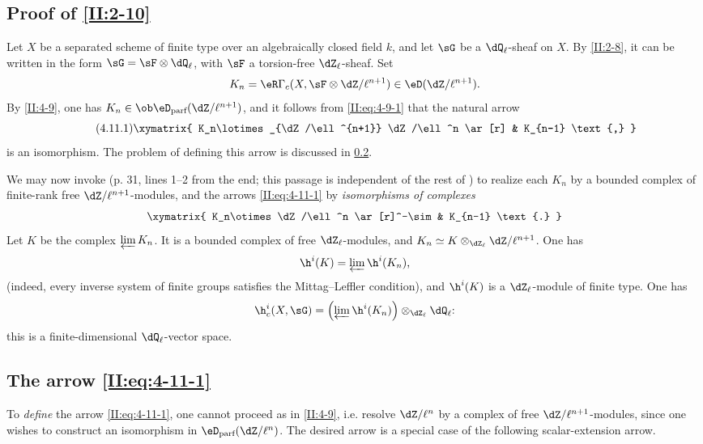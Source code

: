 \documentclass[oneside]{book}
\begin{document}
\subsection{Proof of \texorpdfstring{\ref{II:2-10}}{2.10}}\label{II:4-11}

Let $X$ be a separated scheme of finite type over an algebraically closed
field $k$, and let $\sG$ be a $\dQ_\ell$-sheaf on $X$. By \ref{II:2-8}, it
can be written in the form $\sG=\sF\otimes\dQ_\ell$, with $\sF$ a
torsion-free $\dZ_\ell$-sheaf. Set
\[
  K_n = \eR \Gamma_c(X,\sF\otimes\dZ/\ell^{n+1})\in\eD(\dZ/\ell^{n+1}) \text{.}
\]
By \ref{II:4-9}, one has
$K_n\in\ob\eD_\text{parf}(\dZ/\ell^{n+1})$, and it follows from
\eqref{II:eq:4-9-1} that the natural arrow
\begin{equation*}\tag{4.11.1}\label{II:eq:4-11-1}
\xymatrix{
  K_n\lotimes_{\dZ/\ell^{n+1}} \dZ/\ell^n \ar[r] & K_{n-1} \text{,}
}
\end{equation*}
is an isomorphism. The problem of defining this arrow is discussed in
\ref{II:4-12}.

We may now invoke \cite[XV.3.3]{sga5} (p. 31, lines 1--2 from the end; this
passage is independent of the rest of \cite{sga5}) to realize each $K_n$ by
a bounded complex of finite-rank free $\dZ/\ell^{n+1}$-modules, and the
arrows \eqref{II:eq:4-11-1} by \emph{isomorphisms of complexes}
\[\xymatrix{
  K_n\otimes \dZ/\ell^n \ar[r]^-\sim
    & K_{n-1} \text{.}
}\]
Let $K$ be the complex $\varprojlim K_n$. It is a bounded complex of free
$\dZ_\ell$-modules, and
$K_n\simeq K\otimes_{\dZ_\ell}\dZ/\ell^{n+1}$. One has
\[
  \h^i(K) = \varprojlim \h^i(K_n) \text{,}
\]
(indeed, every inverse system of finite groups satisfies the Mittag--Leffler
condition), and $\h^i(K)$ is a $\dZ_\ell$-module of finite type. One has
\[
  \h_c^i(X,\sG) = \left(\varprojlim \h^i(K_n) \right)\otimes_{\dZ_\ell} \dQ_\ell \text{:}
\]
this is a finite-dimensional $\dQ_\ell$-vector space.






\subsection{The arrow \texorpdfstring{\eqref{II:eq:4-11-1}}{(4.11.1)}}\label{II:4-12}

To \emph{define} the arrow \eqref{II:eq:4-11-1}, one cannot proceed as in
\ref{II:4-9}, i.e. resolve $\dZ/\ell^n$ by a complex of free
$\dZ/\ell^{n+1}$-modules, since one wishes to construct an isomorphism in
$\eD_\text{parf}(\dZ/\ell^n)$. The desired arrow is a special case of the
following scalar-extension arrow.
\end{document}
